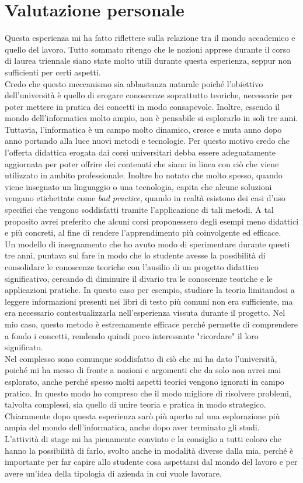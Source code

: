 \section{Valutazione personale}
Questa esperienza mi ha fatto riflettere sulla relazione tra il mondo accademico e quello del lavoro. Tutto sommato ritengo che le nozioni apprese durante il corso di laurea triennale siano state molto utili durante questa esperienza, seppur non sufficienti per certi aspetti. \\
Credo che questo meccanismo sia abbastanza naturale poiché l'obiettivo dell'università è quello di erogare conoscenze soprattutto teoriche, necessarie per poter mettere in pratica dei concetti in modo consapevole. Inoltre, essendo il mondo dell'informatica molto ampio, non è pensabile si esplorarlo in soli tre anni. \\
Tuttavia, l'informatica è un campo molto dinamico, cresce e muta anno dopo anno portando alla luce nuovi metodi e tecnologie. Per questo motivo credo che l'offerta didattica erogata dai corsi universitari debba essere adeguatamente aggiornata per poter offrire dei contenuti che siano in linea con ciò che viene utilizzato in ambito professionale. Inoltre ho notato che molto spesso, quando viene insegnato un linguaggio o una tecnologia, capita che alcune soluzioni vengano etichettate come \textit{bad practice}, quando in realtà esistono dei casi d'uso specifici che vengono soddisfatti tramite l'applicazione di tali metodi. A tal proposito avrei preferito che alcuni corsi proponessero degli esempi meno didattici e più concreti, al fine di rendere l'apprendimento più coinvolgente ed efficace. \\
Un modello di insegnamento che ho avuto modo di sperimentare durante questi tre anni, puntava sul fare in modo che lo studente avesse la possibilità di consolidare le conoscenze teoriche con l'ausilio di un progetto didattico significativo, cercando di diminuire il divario tra le conoscenze teoriche e le applicazioni pratiche. In questo caso per esempio, studiare la teoria limitandosi a leggere informazioni presenti nei libri di testo più comuni non era sufficiente, ma era necessario contestualizzarla nell'esperienza vissuta durante il progetto. Nel mio caso, questo metodo è estremamente efficace perché permette di comprendere a fondo i concetti, rendendo quindi poco interessante "ricordare" il loro significato. \\
Nel complesso sono comunque soddisfatto di ciò che mi ha dato l'università, poiché mi ha messo di fronte a nozioni e argomenti che da solo non avrei mai esplorato, anche perché spesso molti aspetti teorici vengono ignorati in campo pratico. In questo modo ho compreso che il modo migliore di risolvere problemi, talvolta complessi, sia quello di unire teoria e pratica in modo strategico. Chiaramente dopo questa esperienza sarò più aperto ad una esplorazione più ampia del mondo dell'informatica, anche dopo aver terminato gli studi. \\
L'attività di stage mi ha pienamente convinto e la consiglio a tutti coloro che hanno la possibilità di farlo, svolto anche in modalità diverse dalla mia, perché è importante per far capire allo studente cosa aspettarsi dal mondo del lavoro e per avere un'idea della tipologia di azienda in cui vuole lavorare.
